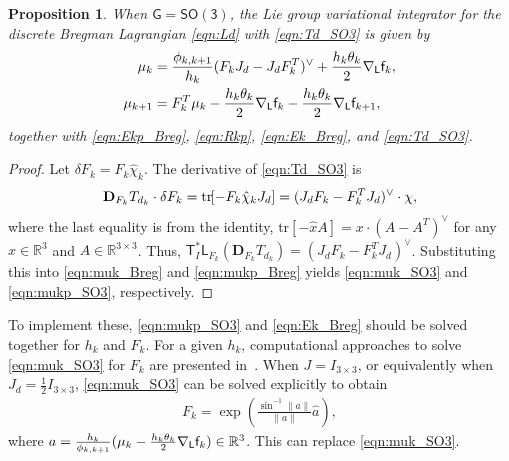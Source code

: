 \documentclass[letterpaper, 10pt, conference]{ieeeconf}
\newcommand{\bracket}[1]{\ensuremath{\left[ #1 \right]}}
\newcommand{\tr}[1]{\mbox{tr}\ensuremath{\negthickspace\bracket{#1}}}
\newcommand{\G}{\ensuremath{\mathsf{G}}}
\newcommand{\SO}{\ensuremath{\mathsf{SO(3)}}}
\newcommand{\T}{\ensuremath{\mathsf{T}}}
\renewcommand{\L}{\ensuremath{\mathsf{L}}}
\renewcommand{\Re}{\ensuremath{\mathbb{R}}}
\newcommand{\D}{\ensuremath{\mathbf{D}}}
\newtheorem{prop}{Proposition}
\begin{document}
\begin{prop}\label{prop:DEL_Breg_SO3}
    When $\G=\SO$, the Lie group variational integrator for the discrete Bregman Lagrangian \eqref{eqn:Ld} with \eqref{eqn:Td_SO3} is given by
\begin{align}
    \mu_k & =\frac{\phi_{k,k+1}}{h_k } (F_k J_d - J_dF_k^T)^\vee + \frac{h_k\theta_k }{2} \nabla_\L \obj_k, \label{eqn:muk_SO3} \\
    \mu_{k+1}  & = F_k^T \mu_k -\frac{h_k\theta_k}{2}\nabla_\L \obj_k - \frac{h_k\theta_k}{2} \nabla_\L \obj_{k+1}, \label{eqn:mukp_SO3}
\end{align}
together with \eqref{eqn:Ekp_Breg}, \eqref{eqn:Rkp}, \eqref{eqn:Ek_Breg},  and \eqref{eqn:Td_SO3}.
\end{prop}
\begin{proof}
    Let $\delta F_k = F_k \hat\chi_k$.
    The derivative of \eqref{eqn:Td_SO3} is %
    \begin{align*}
        \D_{F_k} T_{d_k} \cdot \delta F_k = \tr{-F_k\hat\chi_k J_d} = (J_dF_k - F_k^T J_d)^\vee \cdot \chi,
    \end{align*}
    where the last equality is from the identity, $\mathrm{tr}[-\hat x A]= x\cdot (A-A^T)^\vee$ for any $x\in\Re^3$ and $A\in\Re^{3\times 3}$.
    Thus, $\T^*_I \L_{F_k} (\D_{F_k} T_{d_k}) = (J_dF_k - F_k^T J_d)^\vee $. 
    Substituting this into \eqref{eqn:muk_Breg} and \eqref{eqn:mukp_Breg} yields \eqref{eqn:muk_SO3} and \eqref{eqn:mukp_SO3}, respectively. 
\end{proof}
To implement these, \eqref{eqn:mukp_SO3} and \eqref{eqn:Ek_Breg} should be solved together for $h_k$ and $F_k$.
For a given $h_k$, computational approaches to solve \eqref{eqn:muk_SO3} for $F_k$ are presented in~\cite[Sec 3.3.8]{Lee08}.
When $J=I_{3\times 3}$, or equivalently when $J_d = \frac{1}{2}I_{3\times 3}$, \eqref{eqn:muk_SO3} can be solved explicitly to obtain
\begin{align}
    F_k = \exp \left(\frac{\sin^{-1}\|a\|}{\|a\|}\hat a\right),\label{eqn:Fk_SO3}
\end{align}
where $a = \frac{h_k}{\phi_{k,k+1}} (\mu_k - \frac{h_k\theta_k}{2}\nabla_\L \obj_k)\in\Re^3$.
This can replace \eqref{eqn:muk_SO3}.
\end{document}
